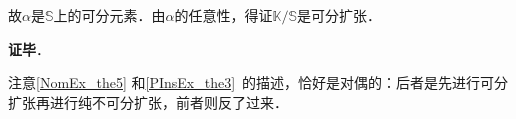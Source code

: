故$\alpha$是$\mathbb{S}$上的可分元素．由$\alpha$的任意性，得证$\mathbb{K}/\mathbb{S}$是可分扩张．

\textbf{证毕}．

注意\autoref{NomEx_the5} 和\autoref{PInsEx_the3}~的描述，恰好是对偶的：后者是先进行可分扩张再进行纯不可分扩张，前者则反了过来．





























